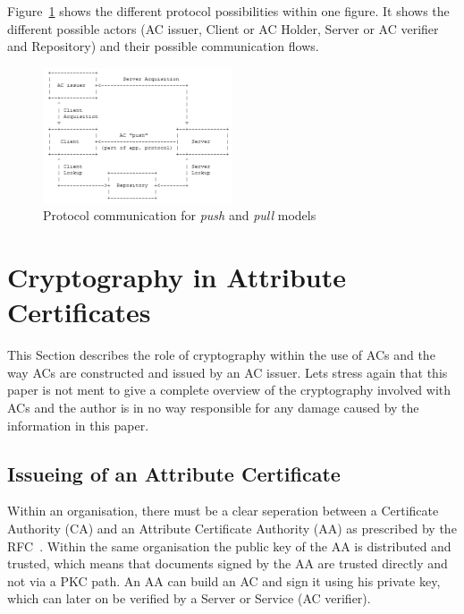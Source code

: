 \documentclass[10pt,conference,a4paper]{IEEEtran}
\begin{document}
Figure~\ref{fig:PKI_models} shows the different protocol possibilities within one figure. It shows the different possible actors (AC issuer, Client or AC Holder, Server or AC verifier and Repository) and their possible communication flows.

\begin{figure}[h]
	\centering
	\includegraphics[width=0.5\textwidth]{PKI_models.png}
	\caption{Protocol communication for \textit{push} and \textit{pull} models~\cite{rfc_ac}}
	\label{fig:PKI_models}
\end{figure}

\section{Cryptography in Attribute Certificates}
\label{cryptography_in_ac}
This Section describes the role of cryptography within the use of ACs and the way ACs are constructed and issued by an AC issuer. Lets stress again that this paper is not ment to give a complete overview of the cryptography involved with ACs and the author is in no way responsible for any damage caused by the information in this paper.

\subsection{Issueing of an Attribute Certificate}
Within an organisation, there must be a clear seperation between a Certificate Authority (CA) and an Attribute Certificate Authority (AA) as prescribed by the RFC~\cite{rfc_ac}. Within the same organisation the public key of the AA is distributed and trusted, which means that documents signed by the AA are trusted directly and not via a PKC path. An AA can build an AC and sign it using his private key, which can later on be verified by a Server or Service (AC verifier).
\end{document}

